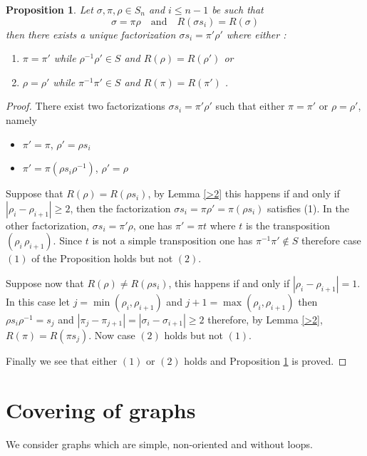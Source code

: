 \documentclass[11pt,a4paper]{amsart}
\newtheorem{proposition}[theorem]{Proposition}
\theoremstyle{contraction}
\begin{document}
\begin{proposition}\label{recoil}
Let $\sigma,\pi,\rho\in S_n$ and $i\leq n-1$ be such that $$\sigma=\pi\rho \quad 
\text{and} \quad R(\sigma s_i)=R(\sigma)$$  then there exists a unique factorization 
$\sigma s_i=\pi'\rho'$ where either : 
\begin{enumerate}
\item
$\pi=\pi'$ while $\rho^{-1}\rho'\in S$ and $R(\rho)=R(\rho')$ or
\item
$\rho=\rho'$ while $\pi^{-1}\pi'\in S$ and $R(\pi)=R(\pi')$ .
\end{enumerate}
\end{proposition}
\begin{proof}
There exist  two factorizations $\sigma s_i=\pi'\rho'$ such that either $\pi=\pi'$ or $\rho=\rho'$, namely

\begin{itemize}
\item
$\pi'=\pi$, $\rho'=\rho s_i$
\item
 $\pi'=\pi(\rho s_i\rho^{-1})$, $\rho'=\rho$
 \end{itemize}

Suppose that $R(\rho)=R(\rho s_i)$, by Lemma \ref{>2} this happens if and only if $|\rho_i-\rho_{i+1}|\geq 2$, then the factorization
$\sigma s_i=\pi\rho'=\pi(\rho s_i)$ satisfies (1). In the other factorization, $\sigma s_i=\pi'\rho$, one has $\pi'=\pi t$ where $t$ is the transposition $(\rho_i\,\rho_{i+1})$. Since $t$ is not a simple transposition one has $\pi^{-1}\pi'\notin S$ therefore  case $(1)$ of the Proposition holds but not $(2)$.

Suppose now that $R(\rho)\ne R(\rho s_i)$,
this happens if and only if $|\rho_i-\rho_{i+1}|=1$. In this case let
$j=\min (\rho_i,\rho_{i+1})$ and $j+1=\max (\rho_i,\rho_{i+1})$ then
$\rho s_i\rho^{-1}=s_j$  and $|\pi_j-\pi_{j+1}|=|\sigma_i-\sigma_{i+1}|\geq 2$ therefore, by Lemma \ref{>2},
$R(\pi)=R(\pi s_j)$. Now case $(2)$ holds but not $(1)$.

Finally we see that  either $(1)$ or $(2)$ holds and  Proposition \ref{recoil} is proved.
\end{proof}
\section{Covering of graphs}
We consider graphs  which are simple, non-oriented and without loops.
\end{document}
